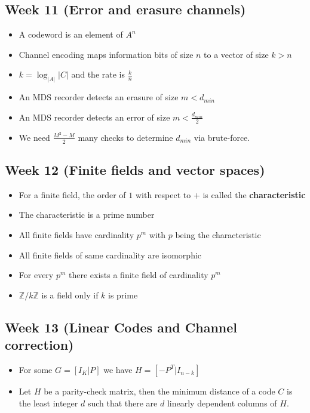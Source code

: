 \documentclass[titlepage]{article}
\begin{document}
\subsection{Week 11 (Error and erasure channels)}
\begin{itemize}
    \item A codeword is an element of $A^{n}$
    \item Channel encoding maps information bits of size $n$ to a vector of size $k > n$
    \item $k = \log_{|A|}|C|$ and the rate is $\frac{k}{n}$
    \item An MDS recorder detects an erasure of size $m < d_{min}$
    \item An MDS recorder detects an error of size $m < \frac{d_{min}}{2}$
    \item We need $\frac{M^{2} - M}{2}$ many checks to determine $d_{min}$ via brute-force.
\end{itemize}


\subsection{Week 12 (Finite fields and vector spaces)}
\begin{itemize}
    \item For a finite field, the order of $1$ with respect to $+$ is called the \textbf{characteristic}
    \item The characteristic is a prime number
    \item All finite fields have cardinality $p^{m}$ with $p$ being the characteristic
    \item All finite fields of same cardinality are isomorphic
    \item For every $p^{m}$ there exists a finite field of cardinality $p^{m}$
    \item $\mathbb{Z}/k\mathbb{Z}$ is a field only if $k$ is prime
\end{itemize}


\subsection{Week 13 (Linear Codes and Channel correction)}

\begin{itemize}
    \item For some $G = [I_{K} | P]$ we have $H = [-P^{T}|I_{n-k}]$
    \item Let $H$ be a parity-check matrix, then the minimum distance of a code $C$ is the least integer $d$ such that there are $d$ linearly dependent columns of $H$.
\end{itemize}
\end{document}

